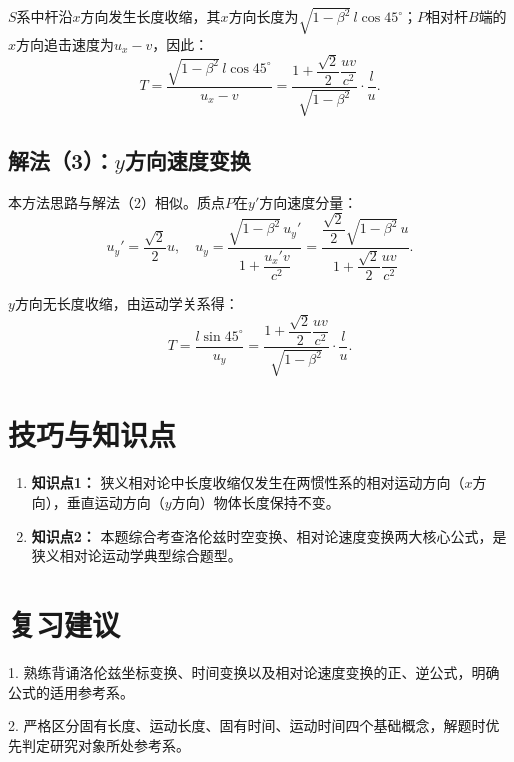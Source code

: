 \documentclass[11pt,a4paper]{ctexart}
\begin{document}
$S$系中杆沿$x$方向发生长度收缩，其$x$方向长度为$\sqrt{1-\beta^2}\,l\cos45^\circ$；$P$相对杆$B$端的$x$方向追击速度为$u_x-v$，因此：
\[
T = \frac{\sqrt{1-\beta^2}\,l\cos45^\circ}{u_x - v}
= \frac{1 + \dfrac{\sqrt{2}}{2}\dfrac{uv}{c^2}}{\sqrt{1-\beta^2}}\cdot\frac{l}{u}.
\]

\subsection*{解法（3）：$y$方向速度变换}
本方法思路与解法（2）相似。质点$P$在$y'$方向速度分量：
\[
u_y' = \frac{\sqrt{2}}{2}u,\quad
u_y = \frac{\sqrt{1-\beta^2}\,u_y'}{1 + \dfrac{u_x'v}{c^2}}
= \frac{\dfrac{\sqrt{2}}{2}\sqrt{1-\beta^2}\,u}{1 + \dfrac{\sqrt{2}}{2}\dfrac{uv}{c^2}}.
\]

$y$方向无长度收缩，由运动学关系得：
\[
T = \frac{l\sin45^\circ}{u_y}
= \frac{1 + \dfrac{\sqrt{2}}{2}\dfrac{uv}{c^2}}{\sqrt{1-\beta^2}}\cdot\frac{l}{u}.
\]

\section*{技巧与知识点}

\begin{tipBox}
\begin{enumerate}
  \item \textbf{知识点1：} 狭义相对论中长度收缩仅发生在两惯性系的相对运动方向（$x$方向），垂直运动方向（$y$方向）物体长度保持不变。
  \item \textbf{知识点2：} 本题综合考查洛伦兹时空变换、相对论速度变换两大核心公式，是狭义相对论运动学典型综合题型。
\end{enumerate}
\end{tipBox}

\section*{复习建议}

1. 熟练背诵洛伦兹坐标变换、时间变换以及相对论速度变换的正、逆公式，明确公式的适用参考系。

2. 严格区分固有长度、运动长度、固有时间、运动时间四个基础概念，解题时优先判定研究对象所处参考系。
\end{document}
